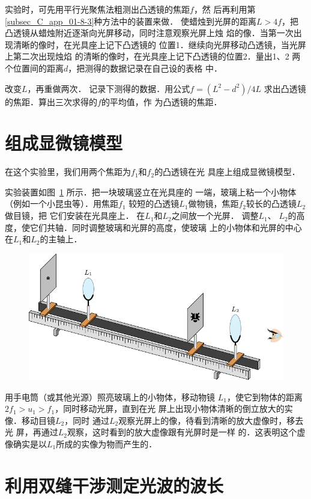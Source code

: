 实验时，可先用平行光聚焦法粗测出凸透镜的焦距$f$，然
后再利用第\ref{subsec_C_app_01-8-3}种方法中的装置来做．
使蜡烛到光屏的距离$L>4f$，把
凸透镜从蜡烛附近逐渐向光屏移动，同时注意观察光屏上烛
焰的像．当第一次出现清晰的像时，在光具座上记下凸透镜的
位置1．继续向光屏移动凸透镜，当光屏上第二次出现烛焰
的清晰的像时，在光具座上记下凸透镜的位置2．量出1、2
两个位置间的距离$d$，把测得的数据记录在自己设的表格
中．

改变$L$，再重做两次．
记录下测得的数据．用公式$f=(L^2-d^2)/4L$
求出凸透镜的焦距．算出三次求得的$f$的平均值，作
为凸透镜的焦距．

\section{组成显微镜模型}
在这个实验里，我们用两个焦距为$f_1$和$f_2$的凸透镜在光
具座上组成显微镜模型．

实验装置如图~\ref{fig_C_10-8} 所示．把一块玻璃竖立在光具座的
一端，玻璃上粘一个小物体（例如一个小昆虫等）．用焦距$f_1$
较短的凸透镜$L_1$做物镜，焦距$f_2$较长的凸透镜$L_2$做目镜，把
它们安装在光具座上．
在$L_1$和$L_2$之间放一个光屏．
调整$L_1$、
$L_2$的高度，使它们共轴．同时调整玻璃和光屏的高度，使玻璃
上的小物体和光屏的中心在$L_1$和$L_2$的主轴上．
\begin{figure}[htbp]
    \centering
    \includegraphics{fig/C/10-8.pdf}
    \caption{}\label{fig_C_10-8}
\end{figure}

用手电筒（或其他光源）照亮玻璃上的小物体，移动物镜
$L_1$，使它到物体的距离$2f_1>u_1>f_1$，同时移动光屏，直到在光
屏上出现小物体清晰的倒立放大的实像．移动目镜$L_2$，同时
通过$L_2$观察光屏上的像，待看到清晰的放大虚像时，移去光
屏，再通过$L_2$观察，这时看到的放大虚像跟有光屏时是一样
的．这表明这个虚像确实是以$L_1$所成的实像为物而产生的．

\section{利用双缝干涉测定光波的波长}

